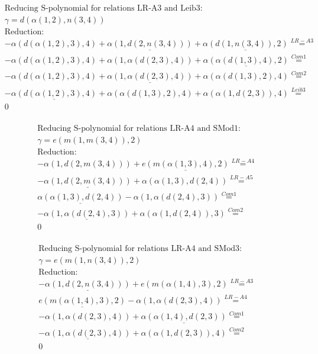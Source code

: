 \documentclass[11pt]{amsart}
\begin{document}
\begin{align*} 
& \text{Reducing S-polynomial for relations LR-A3 and Leib3:} \\ 
& \gamma = d(\alpha(1,2),n(3,4)) \\ 
& \text{Reduction}: \\& - \alpha(d(\alpha(1,2),3),4) + \underline{\alpha(1,d(2,n(3,4)))} + \underline{\alpha(d(1,n(3,4)),2)} \stackrel{ LR-A3 }{=}  \\ 
& - \alpha(d(\alpha(1,2),3),4) + \alpha(1,\alpha(d(2,3),4)) + \underline{\alpha(\alpha(d(1,3),4),2)} \stackrel{ Com1 }{=}  \\ 
& - \alpha(d(\alpha(1,2),3),4) + \underline{\alpha(1,\alpha(d(2,3),4))} + \alpha(\alpha(d(1,3),2),4) \stackrel{ Com2 }{=}  \\ 
& - \underline{\alpha(d(\alpha(1,2),3),4)} + \alpha(\alpha(d(1,3),2),4) + \alpha(\alpha(1,d(2,3)),4) \stackrel{ Leib3 }{=}  \\ 
&0\\ 
\end{align*} 
 
\begin{align*} 
& \text{Reducing S-polynomial for relations LR-A4 and SMod1:} \\ 
& \gamma = e(m(1,m(3,4)),2) \\ 
& \text{Reduction}: \\& - \alpha(1,d(2,m(3,4))) + \underline{e(m(\alpha(1,3),4),2)} \stackrel{ LR-A4 }{=}  \\ 
& - \underline{\alpha(1,d(2,m(3,4)))} + \alpha(\alpha(1,3),d(2,4)) \stackrel{ LR-A5 }{=}  \\ 
&\underline{\alpha(\alpha(1,3),d(2,4))} - \alpha(1,\alpha(d(2,4),3)) \stackrel{ Com1 }{=}  \\ 
& - \underline{\alpha(1,\alpha(d(2,4),3))} + \alpha(\alpha(1,d(2,4)),3) \stackrel{ Com2 }{=}  \\ 
&0\\ 
\end{align*} 
 
\begin{align*} 
& \text{Reducing S-polynomial for relations LR-A4 and SMod3:} \\ 
& \gamma = e(m(1,n(3,4)),2) \\ 
& \text{Reduction}: \\& - \underline{\alpha(1,d(2,n(3,4)))} + e(m(\alpha(1,4),3),2) \stackrel{ LR-A3 }{=}  \\ 
&\underline{e(m(\alpha(1,4),3),2)} - \alpha(1,\alpha(d(2,3),4)) \stackrel{ LR-A4 }{=}  \\ 
& - \alpha(1,\alpha(d(2,3),4)) + \underline{\alpha(\alpha(1,4),d(2,3))} \stackrel{ Com1 }{=}  \\ 
& - \underline{\alpha(1,\alpha(d(2,3),4))} + \alpha(\alpha(1,d(2,3)),4) \stackrel{ Com2 }{=}  \\ 
&0\\ 
\end{align*} 
 
\end{document}
